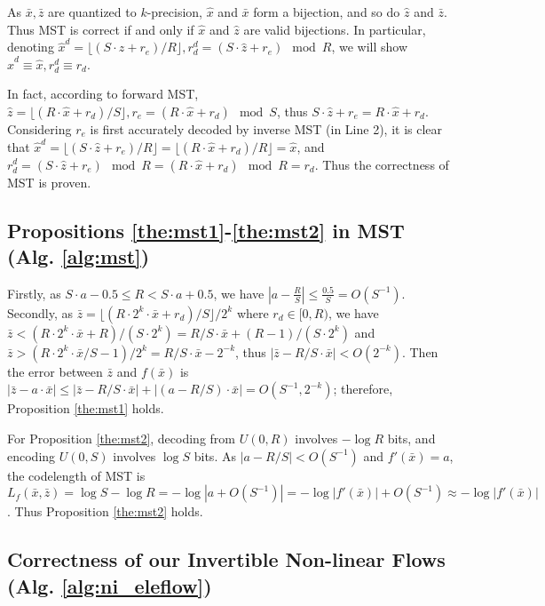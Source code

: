 \documentclass{article}
\newcommand{\quant}[1]{\bar{#1}}
\begin{document}
As $\quant{x}, \quant{z}$ are quantized to $k$-precision, $\hat{x}$ and $\quant{x}$ form a bijection, and so do $\hat{z}$ and $\quant{z}$. 
Thus MST is correct if and only if $\hat{x}$ and $\hat{z}$ are valid bijections. In particular, denoting $\hat{x}^d = \lfloor (S \cdot \hat{z} + r_e) / R \rfloor, r_d^d = (S \cdot \hat{z} + r_e) \mod R$, we will show $\hat{x}^d \equiv \hat{x}, r_d^d \equiv r_d$.

In fact, according to forward MST, $\hat{z} = \lfloor (R \cdot \hat{x} + r_d) / S \rfloor, r_e = (R \cdot \hat{x} + r_d) \mod S$, thus $S \cdot \hat{z} + r_e = R \cdot \hat{x} + r_d$. Considering $r_e$ is first accurately decoded by inverse MST (in Line 2), it is clear that $\hat{x}^d = \lfloor (S \cdot \hat{z} + r_e) / R \rfloor = \lfloor (R \cdot \hat{x} + r_d) / R \rfloor = \hat{x}$, and $r_d^d = (S \cdot \hat{z} + r_e) \mod R = (R \cdot \hat{x} + r_d) \mod R = r_d$. Thus the correctness of MST is proven.

\subsection{Propositions \ref{the:mst1}-\ref{the:mst2} in MST (Alg. \ref{alg:mst})}

Firstly, as $S \cdot a - 0.5 \le R < S \cdot a + 0.5$, we have $|a - \frac{R}{S}| \le \frac{0.5}{S} = O(S^{-1})$. Secondly, as $\quant{z} = \lfloor (R \cdot 2^k \cdot \quant{x} + r_d) / S \rfloor / 2^k$ where $r_d \in [0, R)$, we have $\quant{z} < (R \cdot 2^k \cdot \quant{x} + R) / (S \cdot 2^k) = R/S \cdot \quant{x} + (R - 1) / (S \cdot 2^k)$ and $\quant{z} > (R \cdot 2^k \cdot \quant{x} / S - 1) / 2^k = R/S \cdot \quant{x} - 2^{-k}$, thus $|\quant{z} - R/S \cdot \quant{x}| < O(2^{-k})$. Then the error between $\quant{z}$ and $f(\quant{x})$ is $|\quant{z} - a \cdot \quant{x}| \le |\quant{z} - R/S \cdot \quant{x}| + |(a - R/S) \cdot \quant{x}| = O(S^{-1}, 2^{-k})$; therefore, Proposition \ref{the:mst1} holds.

For Proposition \ref{the:mst2}, decoding from $U(0, R)$ involves $- \log R$ bits, and encoding $U(0, S)$ involves $\log S$ bits. As $|a - R/S| < O(S^{-1})$ and $f'(\quant{x}) = a$, the codelength of MST is $L_f (\quant{x}, \quant{z}) = \log S - \log R = - \log |a + O(S^{-1})| = - \log |f'(\bar{x})| + O(S^{-1}) \approx - \log |f'(\bar{x})|$. Thus Proposition \ref{the:mst2} holds.

\subsection{Correctness of our Invertible Non-linear Flows (Alg. \ref{alg:ni_eleflow})}
\end{document}
